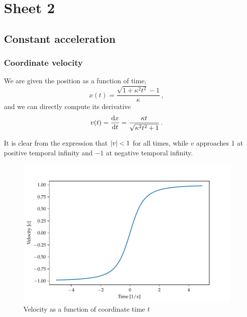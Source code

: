 \documentclass[main.tex]{subfiles}
\begin{document}
\section{Sheet 2}

\subsection{Constant acceleration}

\subsubsection{Coordinate velocity}

We are given the position as a function of time, 
\begin{equation} \label{eq:constant-acceleration} 
  x(t) = \frac{\sqrt{1 + \kappa^2 t^2} -1 }{\kappa }\,,
\end{equation}
%
and we can directly compute its derivative
%
\begin{equation} \label{eq:constant-acceleration-velocity} 
  v(t) = \dv{x}{t} =
  \frac{\kappa t}{\sqrt{\kappa^2 t^2  + 1} }\,.
\end{equation}

It is clear from the expression that \(\abs{v} < 1\) for all times, while \(v\) approaches 1 at positive temporal infinity and \(-1\) at negative temporal infinity.

\begin{figure}[h]
    \centering
    \includegraphics[width=\textwidth]{figures/velocity.pdf}
    \caption{Velocity as a function of coordinate time \(t\)}
    \label{fig:velocity-constant-acceleration}
\end{figure}
\end{document}
